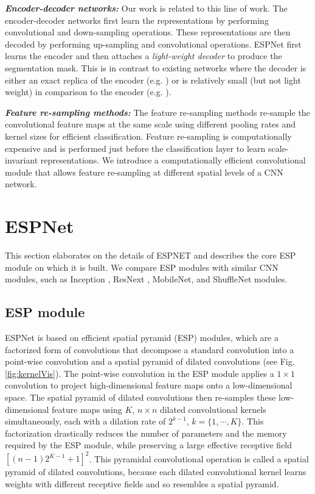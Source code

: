 \documentclass[runningheads]{llncs}
\def\Fig{Fig. }
\begin{document}
\noindent \textbf{\textit{Encoder-decoder networks:}} Our work is related to this line of work. The encoder-decoder networks first learn the representations by performing convolutional and down-sampling operations. These representations are then decoded by performing up-sampling and convolutional operations. ESPNet first learns the encoder and then attaches a \textit{light-weight decoder} to produce the segmentation mask. This is in contrast to existing networks where the decoder is either an exact replica of the encoder (e.g. \cite{badrinarayanan2017segnet}) or  is relatively small (but not light weight) in comparison to the encoder (e.g. \cite{paszke2016enet,romera2018erfnet}). 

\noindent \textbf{\textit{Feature re-sampling methods:}} The feature re-sampling methods re-sample the convolutional feature maps at the same scale using different pooling rates \cite{zhao2017pyramid,he2014spatial} and kernel sizes \cite{chen2016deeplab} for efficient classification. Feature re-sampling is computationally expensive and is performed just before  the classification layer to learn scale-invariant representations. We introduce a computationally efficient convolutional module that allows feature re-sampling at different spatial levels of a CNN network.

\section{ESPNet}
\label{sec:espnetArc}
This section  elaborates on the details of ESPNET and describes the core ESP module on which it is built. We compare ESP modules with similar CNN modules, such as Inception \cite{szegedy2015going,szegedy2016rethinking,SzegedyIV16InceptionV4}, ResNext \cite{xie2017aggregated}, MobileNet\cite{howard2017mobilenets}, and ShuffleNet\cite{zhang2017shufflenet} modules. 

\subsection{ESP module}
ESPNet is based on efficient spatial pyramid (ESP) modules, which are a factorized form of convolutions that decompose a standard convolution into a point-wise convolution and a spatial pyramid of dilated convolutions (see \Fig \ref{fig:kernelVis}). The point-wise convolution in the ESP module applies a $1\times 1$ convolution to project high-dimensional feature maps onto a low-dimensional space. The spatial pyramid of dilated convolutions then re-samples these low-dimensional feature maps using $K$, $n\times n$ dilated convolutional kernels simultaneously, each with a dilation rate of $2^{k-1}$, $k = \{1, \cdots, K\}$. This factorization drastically reduces the number of parameters and the memory required by the ESP module, while preserving a large effective receptive field $\left[ (n-1) 2^{K-1} + 1\right]^2$. This pyramidal convolutional operation is called a spatial pyramid of dilated convolutions, because each dilated convolutional kernel learns weights with different receptive fields and so resembles a spatial pyramid.  
\end{document}
